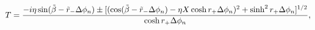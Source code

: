 \begin{equation}
T = { -i\eta \sin(\tilde \beta - \tilde r_- \Delta \phi_n) \pm [( \cos
    (\tilde \beta - \tilde r_- \Delta \phi_n) - \eta X \cosh r_+
    \Delta \phi_n)^2 + \sinh^2 r_+ \Delta \phi_n]^{1/2} \over \cosh
  r_+ \Delta \phi_n},
\end{equation}

